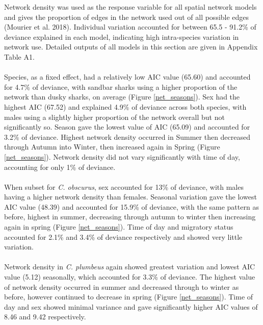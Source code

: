 \documentclass[11pt,a4paper]{article}
\begin{document}
	Network density was used as the response variable for all spatial network models and gives the proportion of edges in the network used out of all possible edges (Mourier et al. 2018). Individual variation accounted for between 65.5 - 91.2\% of deviance explained in each model, indicating high intra-species variation in network use. Detailed outputs of all models in this section are given in Appendix Table A1.\\
	\\	
	Species, as a fixed effect, had a relatively low AIC value (65.60) and accounted for 4.7\% of deviance, with sandbar sharks using a higher proportion of the network than dusky sharks, on average (Figure \ref{net_seasons}). Sex had the highest AIC (67.52) and explained 4.9\% of deviance across both species, with males using a slightly higher proportion of the network overall but not significantly so. Season gave the lowest value of AIC (65.09) and accounted for 3.2\% of deviance. Highest network density occurred in Summer then decreased through Autumn into Winter, then increased again in Spring (Figure \ref{net_seasons}). Network density did not vary significantly with time of day, accounting for only 1\% of deviance.\\
	\\
	When subset for \textit{C. obscurus}, sex accounted for 13\% of deviance, with males having a higher network density than females. Seasonal variation gave the lowest AIC value (48.39) and accounted for 15.9\% of deviance, with the same pattern as before, highest in summer, decreasing through autumn to winter then increasing again in spring (Figure \ref{net_seasons}). Time of day and migratory status accounted for 2.1\% and 3.4\% of deviance respectively and showed very little variation.\\
	\\
	Network density in \textit{C. plumbeus} again showed greatest variation and lowest AIC value (5.12) seasonally, which accounted for 3.3\% of deviance. The highest value of network density occurred in summer and decreased through to winter as before, however continued to decrease in spring (Figure \ref{net_seasons}). Time of day and sex showed minimal variance and gave significantly higher AIC values of 8.46 and 9.42 respectively.
	
\end{document}
